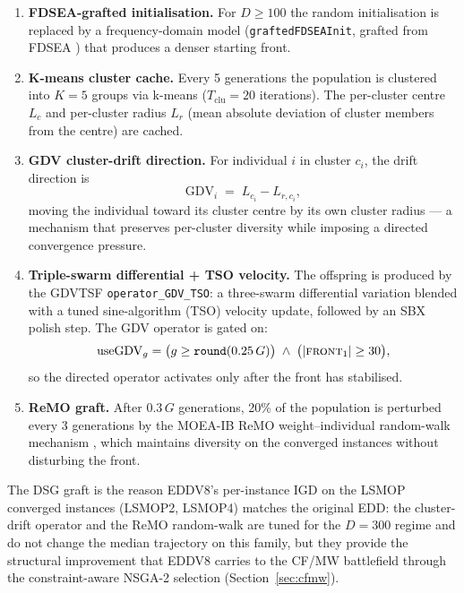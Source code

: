 \documentclass[preprint,12pt]{elsarticle}
\begin{document}
\begin{enumerate}
\item \textbf{FDSEA-grafted initialisation.} For $D \ge 100$ the random
initialisation is replaced by a frequency-domain model
(\texttt{graftedFDSEAInit}, grafted from FDSEA \cite{fdsea2026}) that
produces a denser starting front.

\item \textbf{K-means cluster cache.} Every 5 generations the population is
clustered into $K=5$ groups via k-means ($T_{\mathrm{clu}}=20$
iterations). The per-cluster centre $L_c$ and per-cluster radius
$L_r$ (mean absolute deviation of cluster members from the centre) are
cached.

\item \textbf{GDV cluster-drift direction.} For individual $i$ in cluster
$c_i$, the drift direction is
\begin{equation}
\mathrm{GDV}_i \;=\; L_{c_i} - L_{r,c_i},
\label{eq:gdv}
\end{equation}
moving the individual toward its cluster centre by its own cluster radius
--- a mechanism that preserves per-cluster diversity while imposing a
directed convergence pressure.

\item \textbf{Triple-swarm differential + TSO velocity.} The offspring is
produced by the GDVTSF \texttt{operator\_GDV\_TSO}: a three-swarm
differential variation blended with a tuned sine-algorithm (TSO) velocity
update, followed by an SBX polish step. The GDV operator is gated on:
\begin{equation}
\mathrm{useGDV}_g = \bigl(g \ge \texttt{round}(0.25\,G)\bigr)
\;\land\; \bigl(|\textsc{front}_1| \ge 30\bigr),
\label{eq:gdvgate}
\end{equation}
so the directed operator activates only after the front has stabilised.

\item \textbf{ReMO graft.} After $0.3\,G$ generations, 20\% of the
population is perturbed every 3 generations by the MOEA-IB ReMO
weight--individual random-walk mechanism \cite{moaib2026}, which
maintains diversity on the converged instances without disturbing the
front.
\end{enumerate}

The DSG graft is the reason EDDV8's per-instance IGD on the LSMOP
converged instances (LSMOP2, LSMOP4) matches the original EDD: the
cluster-drift operator and the ReMO random-walk are tuned for the
$D=300$ regime and do not change the median trajectory on this family,
but they provide the structural improvement that EDDV8 carries to the
CF/MW battlefield through the constraint-aware NSGA-2 selection
(Section~\ref{sec:cfmw}).
\end{document}
